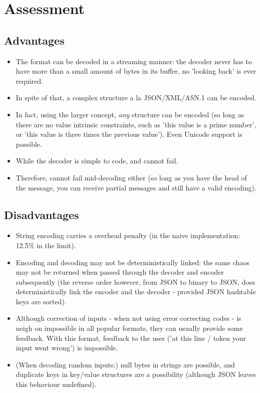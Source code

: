\section{Assessment}

\subsection{Advantages}

\begin{itemize}
\item The format can be decoded in a streaming manner: the decoder never
      has to have
      more than a small amount of bytes in its buffer, no 'looking back' is
      ever required.
\item In spite of that, a complex structure a la JSON/XML/ASN.1 can be
      encoded.
\item In fact, using the larger concept, \textit{any} structure can
      be encoded (so long as there are no value intrinsic constraints, such
      as 'this value is a prime number', or 'this value is three times the
      previous value'). Even Unicode support is possible.
\item While the decoder is simple to code, and cannot fail.
\item Therefore, cannot fail mid-decoding either (so long as you have the
      head of the message, you can receive
      partial messages and still have a valid encoding).
\end{itemize}

\subsection{Disadvantages}

\begin{itemize}
\item String encoding carries a overhead penalty
      (in the naive implementation: 12.5\% in the limit).
\item Encoding and decoding may not be deterministically linked: the same
      chaos may not be returned when passed through the decoder and encoder
      subsequently (the reverse order however, from JSON to binary to JSON,
      does deterministically link the encoder and the decoder - provided
      JSON hashtable keys are sorted).
\item Although correction of inputs - when not using error correcting codes -
      is neigh on impossible in all popular formats, they can usually
      provide some feedback. With this format, feedback to the user
      ('at this line / token your input went wrong') is impossible.
\item (When decoding random inputs:) null bytes in strings are possible,
      and duplicate
      keys in key/value structures are a possibility (although JSON
      leaves this behaviour undefined).
\end{itemize}
